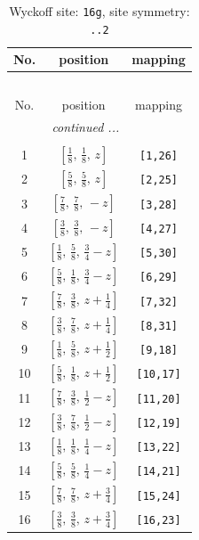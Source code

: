 \documentclass[fleqn,8pt]{jsarticle}
\begin{document}
\renewcommand{\arraystretch}{1.2}
\begin{longtable}{ccc}
\caption{Wyckoff site: {\tt 16g}, site symmetry: {\tt ..2}}
 \\
 \hline \hline
No. & position & mapping \\ \hline \endfirsthead

\multicolumn{2}{l}{\tablename\ \thetable{}} \\
 \hline \hline
No. & position & mapping \\ \hline \endhead

 \hline \hline
\multicolumn{2}{r}{\footnotesize\it continued ...} \\ \endfoot

 \hline \hline
\multicolumn{2}{r}{} \\ \endlastfoot

1 & $\left[ \frac{1}{8},\, \frac{1}{8},\, z \right]$ & {\tt [1,26]} \\ \hline
2 & $\left[ \frac{5}{8},\, \frac{5}{8},\, z \right]$ & {\tt [2,25]} \\ \hline
3 & $\left[ \frac{7}{8},\, \frac{7}{8},\, - z \right]$ & {\tt [3,28]} \\ \hline
4 & $\left[ \frac{3}{8},\, \frac{3}{8},\, - z \right]$ & {\tt [4,27]} \\ \hline
5 & $\left[ \frac{1}{8},\, \frac{5}{8},\, \frac{3}{4} - z \right]$ & {\tt [5,30]} \\ \hline
6 & $\left[ \frac{5}{8},\, \frac{1}{8},\, \frac{3}{4} - z \right]$ & {\tt [6,29]} \\ \hline
7 & $\left[ \frac{7}{8},\, \frac{3}{8},\, z + \frac{1}{4} \right]$ & {\tt [7,32]} \\ \hline
8 & $\left[ \frac{3}{8},\, \frac{7}{8},\, z + \frac{1}{4} \right]$ & {\tt [8,31]} \\ \hline
9 & $\left[ \frac{1}{8},\, \frac{5}{8},\, z + \frac{1}{2} \right]$ & {\tt [9,18]} \\ \hline
10 & $\left[ \frac{5}{8},\, \frac{1}{8},\, z + \frac{1}{2} \right]$ & {\tt [10,17]} \\ \hline
11 & $\left[ \frac{7}{8},\, \frac{3}{8},\, \frac{1}{2} - z \right]$ & {\tt [11,20]} \\ \hline
12 & $\left[ \frac{3}{8},\, \frac{7}{8},\, \frac{1}{2} - z \right]$ & {\tt [12,19]} \\ \hline
13 & $\left[ \frac{1}{8},\, \frac{1}{8},\, \frac{1}{4} - z \right]$ & {\tt [13,22]} \\ \hline
14 & $\left[ \frac{5}{8},\, \frac{5}{8},\, \frac{1}{4} - z \right]$ & {\tt [14,21]} \\ \hline
15 & $\left[ \frac{7}{8},\, \frac{7}{8},\, z + \frac{3}{4} \right]$ & {\tt [15,24]} \\ \hline
16 & $\left[ \frac{3}{8},\, \frac{3}{8},\, z + \frac{3}{4} \right]$ & {\tt [16,23]} \\
\end{longtable}
\end{document}
